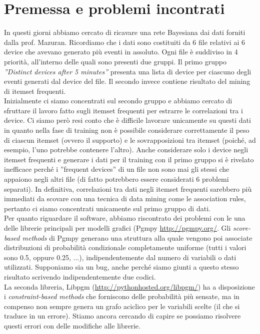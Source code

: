 \documentclass[a4paper]{article}
\begin{document}
\section*{Premessa e problemi incontrati}
In questi giorni abbiamo cercato di ricavare una rete Bayesiana dai dati forniti dalla prof. Mazuran. Ricordiamo che i dati sono costituiti da 6 file relativi ai 6 device che avevano generato più eventi in assoluto. Ogni file è suddiviso in 4 priorità, all'interno delle quali sono presenti due gruppi. Il primo gruppo \textit{''Distinct devices after 5 minutes''} presenta una lista di device per ciascuno degli eventi generati dal device del file. Il secondo invece contiene risultato del mining di itemset frequenti. \\
Inizialmente ci siamo concentrati sul secondo gruppo e abbiamo cercato di sfruttare il lavoro fatto sugli itemset frequenti per estrarre le correlazioni tra i device. Ci siamo però resi conto che è difficile lavorare unicamente su questi dati in quanto nella fase di training non è possibile considerare correttamente il peso di ciascun itemset (ovvero il supporto) e le sovrapposizioni tra itemset (poiché, ad esempio, l'uno potrebbe contenere l'altro). Anche considerare solo i device negli itemset frequenti e generare i dati per il training con il primo gruppo si è rivelato inefficace perché i ''frequent devices'' di un file non sono mai gli stessi che appaiono negli altri file (di fatto potrebbero essere considerati 6 problemi separati). In definitiva, correlazioni tra dati negli itemset frequenti sarebbero più immediati da scovare con una tecnica di data mining come le association rules, pertanto ci siamo concentrati unicamente sul primo gruppo di dati. \\
Per quanto riguardare il software, abbiamo riscontrato dei problemi con le una delle librerie principali per modelli grafici (Pgmpy \url{http://pgmpy.org/}. Gli \textit{score-based methods} di Pgmpy generano una struttura alla quale vengono poi associate distribuzioni di probabilità condizionale completamente uniforme (tutti i valori sono 0.5, oppure 0.25, ...), indipendentemente dal numero di variabili o dati utilizzati. Supponiamo sia un bug, anche perché siamo giunti a questo stesso risultato scrivendo indipendentemente due codici. \\
La seconda libreria, Libpgm (\url{http://pythonhosted.org/libpgm/}) ha a disposizione i \textit{constraint-based methods} che forniscono delle probabilità più sensate, ma in compenso non sempre genera un grafo aciclico per le variabili scelte (il che si traduce in un errore). Stiamo ancora cercando di capire se possiamo risolvere questi errori con delle modifiche alle librerie.
\end{document}
